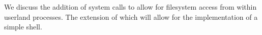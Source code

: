 We discuss the addition of system calls to allow for filesystem access from
within userland processes. The extension of which will allow for the
implementation of a simple shell.
